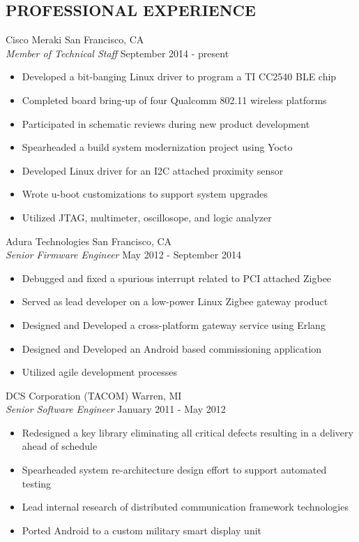 \documentclass[line]{res}
\begin{document}
\begin{resume}
\section{PROFESSIONAL EXPERIENCE}
    \vspace{1mm}
    Cisco Meraki  \hfill San Francisco, CA\\
    {\sl Member of Technical Staff} \hfill September  2014 - present
    \vspace{1mm}
    \begin{itemize}
        \item Developed a bit-banging Linux driver to program a TI CC2540 BLE chip
        \item Completed board bring-up of four Qualcomm 802.11 wireless platforms
        \item Participated in schematic reviews during new product development 
        \item Spearheaded a build system modernization project using Yocto
        \item Developed Linux driver for an I2C attached proximity sensor
        \item Wrote u-boot customizations to support system upgrades  
        \item Utilized JTAG, multimeter, oscillosope, and logic analyzer
    \end{itemize}
    \vspace{1mm}
    Adura Technologies  \hfill San Francisco, CA\\
    {\sl Senior Firmware Engineer} \hfill May  2012 - September 2014
    \vspace{1mm}
    \begin{itemize}
       \item Debugged and fixed a spurious interrupt related to PCI attached Zigbee
       \item Served as lead developer on a low-power Linux Zigbee gateway product
       \item Designed and Developed a cross-platform gateway service using Erlang
       \item Designed and Developed an Android based commissioning application
       \item Utilized agile development processes
    \end{itemize}
    \vspace{-1mm}
    DCS Corporation (TACOM)  \hfill Warren, MI\\
    {\sl Senior Software Engineer} \hfill January 2011 - May 2012
    \vspace{1mm}
    \begin{itemize}
       \item Redesigned a key library eliminating all critical defects resulting in a delivery ahead of schedule
       \item Spearheaded system re-architecture design effort to support automated testing
       \item Lead internal research of distributed communication framework technologies
       \item Ported Android to a custom military smart display unit
    \end{itemize}


\end{resume}
\end{document}
